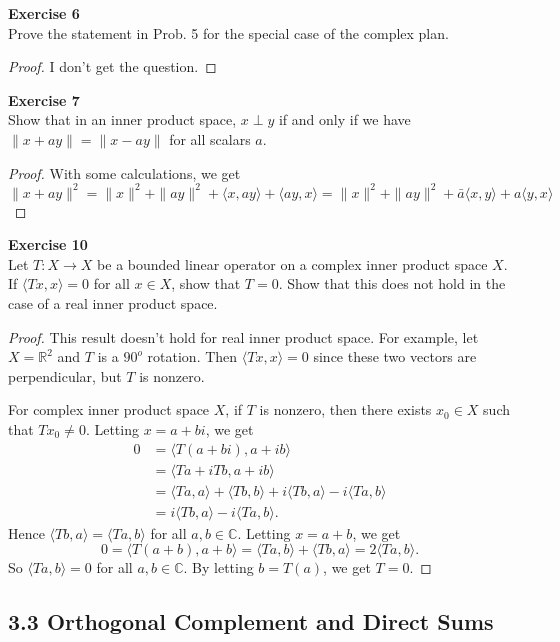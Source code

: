 \documentclass[12pt, a4paper]{article}
\theoremstyle{plain}
\newcommand{\R}{\mathbb{R}}
\newcommand{\C}{\mathbb{C}}
\newenvironment{exercise}[2][Exercise]
    { \begin{mdframed}[backgroundcolor=gray!20] \textbf{#1 #2} \\}
    {  \end{mdframed}}
\begin{document}
\begin{exercise}{6}
Prove the statement in Prob. 5 for the special case of the complex plan.
\end{exercise}
	\begin{proof}
	I don't get the question.
	\end{proof}
	
\begin{exercise}{7}
Show that in an inner product space, $x\perp y$ if and only if we have $\|x+ay\|=\|x-ay\|$ for all scalars $a$.
\end{exercise}
	\begin{proof}
	With some calculations, we get $\|x+ay\|^2=\|x\|^2+\|ay\|^2+\langle{x,ay}\rangle+\langle{ay,x}\rangle = \|x\|^2 +\|ay\|^2 + \bar a\langle{x,y}\rangle + a\langle{y,x}\rangle$
	\end{proof}

\begin{exercise}{10}
Let $T:X\rightarrow X$ be a bounded linear operator on a complex inner product space $X$. If $\langle{Tx,x}\rangle = 0$ for all $x\in X$, show that $T=0$. Show that this does not hold in the case of a real inner product space.
\end{exercise}
	\begin{proof}
	This result doesn't hold for real inner product space. For example, let $X=\R^2$ and $T$ is a $90^o$ rotation. Then $\langle{Tx,x}\rangle = 0$ since these two vectors are perpendicular, but $T$ is nonzero.
	
	For complex inner product space $X$, if $T$ is nonzero, then there exists $x_0\in X$ such that $Tx_0\neq 0$. Letting $x = a+bi$, we get 
	\begin{align*}
	0 &= \langle{T(a+bi),a+ib}\rangle\\
	&= \langle{Ta+iTb,a+ib}\rangle\\
	&= \langle{Ta,a}\rangle + \langle{Tb,b}\rangle +i\langle{Tb,a}\rangle -i\langle{Ta,b}\rangle\\
	&= i\langle{Tb,a}\rangle -i\langle{Ta,b}\rangle.
	\end{align*}
	Hence $\langle{Tb,a}\rangle = \langle{Ta,b}\rangle$ for all $a,b\in \C$. Letting $x = a+b$, we get
	\[
	0 = \langle{T(a+b),a+b}\rangle = \langle{Ta,b}\rangle +\langle{Tb,a}\rangle = 2\langle{Ta,b}\rangle.
	\]
	So $\langle{Ta,b}\rangle = 0$ for all $a,b\in \C$. By letting $b = T(a)$, we get $T=0$.
	\end{proof}
	
	
\subsection*{3.3 Orthogonal Complement and Direct Sums}
\end{document}
